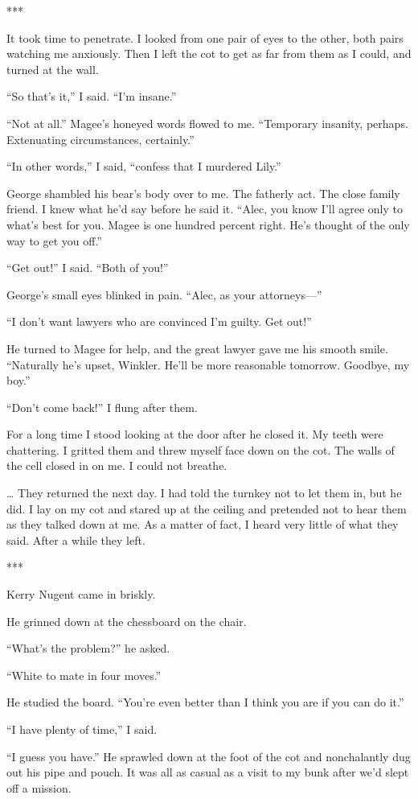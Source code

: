{***

It took time to penetrate. I looked from one pair of eyes to the other, both pairs watching me anxiously. Then I left the cot to get as far from them as I could, and turned at the wall.

“So that’s it,” I said. “I’m insane.”

“Not at all.” Magee’s honeyed words flowed to me. “Temporary insanity, perhaps. Extenuating circumstances, certainly.”

“In other words,” I said, “confess that I murdered Lily.”

George shambled his bear’s body over to me. The fatherly act. The close family friend. I knew what he’d say before he said it. “Alec, you know I’ll agree only to what’s best for you. Magee is one hundred percent right. He’s thought of the only way to get you off.”

“Get out!” I said. “Both of you!”

George’s small eyes blinked in pain. “Alec, as your attorneys—”

“I don’t want lawyers who are convinced I’m guilty. Get out!”

He turned to Magee for help, and the great lawyer gave me his smooth smile. “Naturally he’s upset, Winkler. He’ll be more reasonable tomorrow. Goodbye, my boy.”

“Don’t come back!” I flung after them.

For a long time I stood looking at the door after he closed it. My teeth were chattering. I gritted them and threw myself face down on the cot. The walls of the cell closed in on me. I could not breathe.

… They returned the next day. I had told the turnkey not to let them in, but he did. I lay on my cot and stared up at the ceiling and pretended not to hear them as they talked down at me. As a matter of fact, I heard very little of what they said. After a while they left.

***

Kerry Nugent came in briskly.

He grinned down at the chessboard on the chair.

“What’s the problem?” he asked.

“White to mate in four moves.”

He studied the board. “You’re even better than I think you are if you can do it.”

“I have plenty of time,” I said.

“I guess you have.” He sprawled down at the foot of the cot and nonchalantly dug out his pipe and pouch. It was all as casual as a visit to my bunk after we’d slept off a mission.

}
